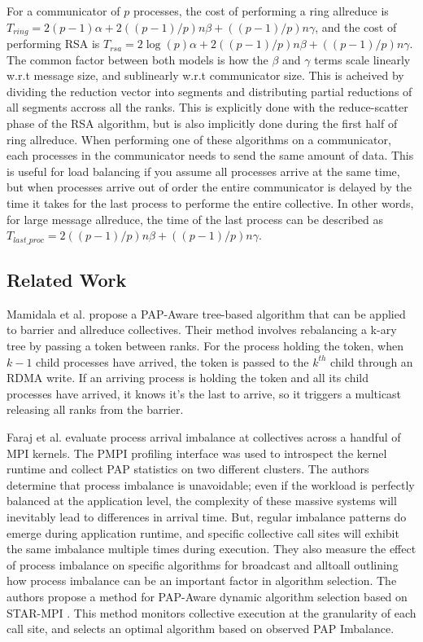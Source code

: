 For a communicator of $p$ processes, the cost of performing a ring allreduce is $T_{ring} = 2(p-1)\alpha + 2((p-1)/p)n\beta + ((p-1)/p)n\gamma$, and the cost of performing RSA is $T_{rsa} = 2\log(p)\alpha + 2((p-1)/p)n\beta + ((p-1)/p)n\gamma$.
The common factor between both models is how the $\beta$ and $\gamma$ terms scale linearly w.r.t message size, and sublinearly w.r.t communicator size.
This is acheived by dividing the reduction vector into segments and distributing partial reductions of all segments accross all the ranks.
This is explicitly done with the reduce-scatter phase of the RSA algorithm, but is also implicitly done during the first half of ring allreduce.
When performing one of these algorithms on a communicator, each processes in the communicator needs to send the same amount of data.
This is useful for load balancing if you assume all processes arrive at the same time, but when processes arrive out of order the entire communicator is delayed by the time it takes for the last process to performe the entire collective.
In other words, for large message allreduce, the time of the last process can be described as $T_{last\_proc}=2((p-1)/p)n\beta + ((p-1)/p)n\gamma$.

\subsection{Related Work}

Mamidala et al. \cite{Mamidala2004BarrierAllreduceIBAdaptive} propose a PAP-Aware tree-based algorithm that can be applied to barrier and allreduce collectives.
Their method involves rebalancing a k-ary tree by passing a token between ranks.
For the process holding the token, when $k-1$ child processes have arrived, the token is passed to the $k^{th}$ child through an RDMA write.
If an arriving process is holding the token and all its child processes have arrived, it knows it's the last to arrive, so it triggers a multicast releasing all ranks from the barrier. 

Faraj et al. \cite{Faraj2008StudyProcArrivalMPIColl} evaluate process arrival imbalance at collectives across a handful of MPI kernels.
The PMPI profiling interface was used to introspect the kernel runtime and collect PAP statistics on two different clusters.
The authors determine that process imbalance is unavoidable; even if the workload is perfectly balanced at the application level, the complexity of these massive systems will inevitably lead to differences in arrival time. 
But, regular imbalance patterns do emerge during application runtime, and specific collective call sites will exhibit the same imbalance multiple times during execution.
They also measure the effect of process imbalance on specific algorithms for broadcast and alltoall outlining how process imbalance can be an important factor in algorithm selection.
The authors propose a method for PAP-Aware dynamic algorithm selection based on STAR-MPI \cite{Faraj2006StarMPI}.
This method monitors collective execution at the granularity of each call site, and selects an optimal algorithm based on observed PAP Imbalance. 

